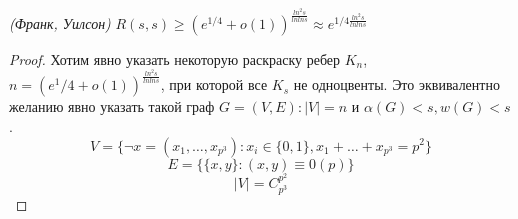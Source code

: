 \begin{theorem}
    \emph{(Франк, Уилсон)}
    $R(s,s) \ge(e^{1/4} + o(1))^{\frac{ln^2s}{ln ln s}} \approx e^{1/4\frac{ln^2 s}{ln ln s}}$
    \begin{proof}
        Хотим явно указать некоторую раскраску ребер $K_n$, 
        $n=(e^1/4 + o(1))^\frac{ln^2 s}{ln ln s}$, 
        при которой все $K_s$ не одноцвенты. 
        Это эквивалентно желанию явно указать такой граф $G=(V,E):|V|=n$ и $\alpha(G) < s, w(G) < s$.
        $$V=\{\neg x = (x_1, \ldots, x_{p^3}): x_i \in \{0,1\}, x_1 + \ldots + x_{p^3} = p^2\}$$
        $$E = \{ \{x,y\}: (x,y) \equiv 0(p)\}$$
        $$ |V| = C_{p^3}^{p^2} $$
    \end{proof}
\end{theorem}

